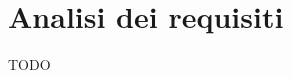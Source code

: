 \documentclass{llncs}
\newcommand{\labelsec}[1]{\label{sec:#1}}
\newcommand{\labelssec}[1]{\label{ssec:#1}}
\begin{document}
\section{Analisi dei requisiti}\labelsec{req_analysis}
TODO %








\end{document}
